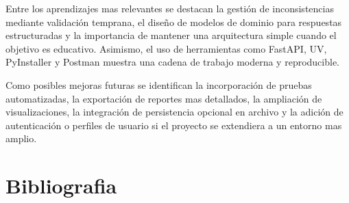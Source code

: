 \documentclass[12pt,onecolumn]{IEEEtran}
\begin{document}
Entre los aprendizajes mas relevantes se destacan la gestión de inconsistencias mediante validación temprana, el diseño de modelos de dominio para respuestas estructuradas y la importancia de mantener una arquitectura simple cuando el objetivo es educativo. Asimismo, el uso de herramientas como FastAPI, UV, PyInstaller y Postman muestra una cadena de trabajo moderna y reproducible.

Como posibles mejoras futuras se identifican la incorporación de pruebas automatizadas, la exportación de reportes mas detallados, la ampliación de visualizaciones, la integración de persistencia opcional en archivo y la adición de autenticación o perfiles de usuario si el proyecto se extendiera a un entorno mas amplio.

\section{Bibliografia}
\end{document}
